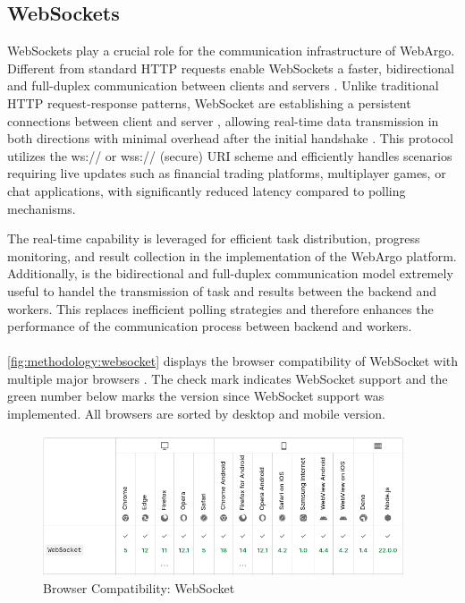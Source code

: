 \subsection{WebSockets}
\label{sec:methodology:websockets}
WebSockets play a crucial role for the communication infrastructure of WebArgo. Different from standard \ac{HTTP} requests enable WebSockets a faster, bidirectional and full-duplex communication between clients and servers \cite{methodology:websockets1, methodology:websockets3, methodology:websockets2}. Unlike traditional \ac{HTTP} request-response patterns, WebSocket are establishing a persistent connections between client and server \cite{methodology:websockets3}, allowing real-time data transmission in both directions with minimal overhead after the initial handshake \cite{methodology:websockets3}. This protocol utilizes the ws:// or wss:// (secure) URI scheme and efficiently handles scenarios requiring live updates such as financial trading platforms, multiplayer games, or chat applications, with significantly reduced latency compared to polling mechanisms.

The real-time capability is leveraged for efficient task distribution, progress monitoring, and result collection in the implementation of the WebArgo platform. Additionally, is the bidirectional and full-duplex communication model extremely useful to handel the transmission of task and results between the backend and workers. This replaces inefficient polling strategies and therefore enhances the performance of the communication process between backend and workers.
\\~\\
\autoref{fig:methodology:websocket} displays the browser compatibility of WebSocket with multiple major browsers \cite{methodology:websockets1}. The check mark indicates WebSocket support and the green number below marks the version since WebSocket support was implemented. All browsers are sorted by desktop and mobile version.
\begin{figure}[htbp]
  \centering
  \includegraphics[width=0.95\textwidth]{gfx/figures/websocket-browsercompability.png}
  \caption{Browser Compatibility: WebSocket \cite{methodology:websockets1}}
  \label{fig:methodology:websocket}
\end{figure}

